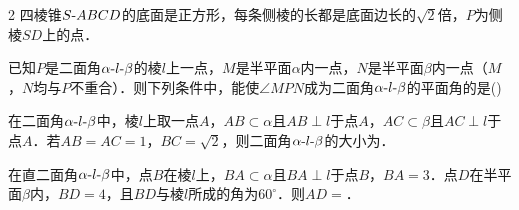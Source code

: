 \documentclass[fontset=none]{ctexart}
\begin{document}
\begin{multicols}{2}
 四棱锥\(S\text{-}\penalty100 ABCD\)的底面是正方形，每条侧棱的长都是底面边长的\(\sqrt{2}\)倍，\(P\)为侧棱\(SD\)上的点．
\xiexwei{48mm}
\begin{ansblock}[练-课时09-8]
\end{ansblock}

 已知\(P\)是二面角\(\alpha\text{-}\penalty100 l\text{-}\penalty100 \beta\)的棱\(l\)上一点，\(M\)是半平面\(\alpha\)内一点，\(N\)是半平面\(\beta\)内一点（\(M\)，\(N\)均与\(P\)不重合）．则下列条件中，能使\(\angle MPN\)成为二面角\(\alpha\text{-}\penalty100 l\text{-}\penalty100 \beta\)的平面角的是\nobreak(\kongwei)
\begin{ansblock}[练-课时09-9]
\end{ansblock}

 在二面角\(\alpha\text{-}\penalty100 l\text{-}\penalty100 \beta\)中，棱\(l\)上取一点\(A\)，\(AB\subset\alpha\)且\(AB\perp l\)于点\(A\)，\(AC\subset\beta\)且\(AC\perp l\)于点\(A\)．若\(AB=AC=1\)，\(BC=\sqrt{2}\)，则二面角\(\alpha\text{-}\penalty100 l\text{-}\penalty100 \beta\)的大小为\kongbai{}．
\begin{ansblock}[练-课时09-10]
\setlength{\anshang}{7.6mm}%
\end{ansblock}


 在直二面角\(\alpha\text{-}\penalty100 l\text{-}\penalty100 \beta\)中，点\(B\)在棱\(l\)上，\(BA\subset\alpha\)且\(BA\perp l\)于点\(B\)，\(BA=3\)．点\(D\)在半平面\(\beta\)内，\(BD=4\)，且\(BD\)与棱\(l\)所成的角为\(60^\circ\)．则\(AD=\)\kongbai{}．
\begin{ansblock}[练-课时09-11]
\setlength{\anshang}{7.6mm}%
\end{ansblock}


\end{multicols}
\end{document}
